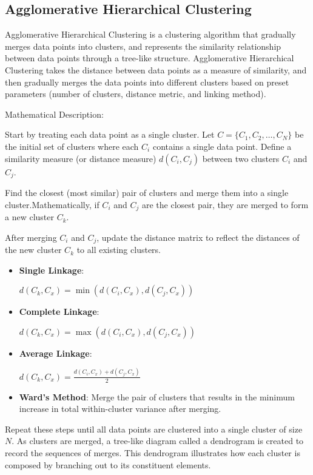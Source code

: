 \documentclass[conference]{IEEEtran}
\begin{document}
	\subsection{Agglomerative Hierarchical Clustering}\label{AA}
	Agglomerative Hierarchical Clustering is a clustering algorithm that gradually merges data points into clusters, and represents the similarity relationship between data points through a tree-like structure. Agglomerative Hierarchical Clustering takes the distance between data points as a measure of similarity, and then gradually merges the data points into different clusters based on preset parameters (number of clusters, distance metric, and linking method).
	
	Mathematical Description:
	
	Start by treating each data point as a single cluster. Let $C = \{C_1, C_2, \ldots, C_N\}$ be the initial set of clusters where each $C_i$ contains a single data point. Define a similarity measure (or distance measure) $d(C_i, C_j)$ between two clusters $C_i$ and $C_j$.
	
	Find the closest (most similar) pair of clusters and merge them into a single cluster.Mathematically, if $C_i$ and $C_j$ are the closest pair, they are merged to form a new cluster $C_k$.
	
	After merging $C_i$ and $C_j$, update the distance matrix to reflect the distances of the new cluster $C_k$ to all existing clusters. 
	\begin{itemize}
		\item \textbf{Single Linkage}:
		
		 $d(C_k, C_x) = \min(d(C_i, C_x), d(C_j, C_x))$
		\item \textbf{Complete Linkage}: 
		
		$d(C_k, C_x) = \max(d(C_i, C_x), d(C_j, C_x))$
		\item \textbf{Average Linkage}: 
		
		$d(C_k, C_x) = \frac{d(C_i, C_x) + d(C_j, C_x)}{2}$
		\item \textbf{Ward's Method}: Merge the pair of clusters that results in the minimum increase in total within-cluster variance after merging.
	\end{itemize}
	
	Repeat these steps until all data points are clustered into a single cluster of size $N$. As clusters are merged, a tree-like diagram called a dendrogram is created to record the sequences of merges. This dendrogram illustrates how each cluster is composed by branching out to its constituent elements.
	
\end{document}
